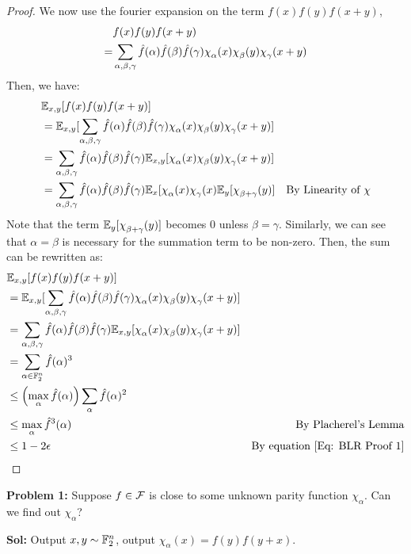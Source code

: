 \begin{theorem}
\begin{proof}
        We now use the fourier expansion on the term $f(x)f(y)f(x+y)$,
        \begin{align*}
            &f(x)f(y)f(x+y)\\
            =&\sum_{\alpha,\beta,\gamma} \fhat(\alpha)\fhat(\beta)\fhat(\gamma) \chi_\alpha(x)\chi_\beta(y)\chi_\gamma(x+y)
        \end{align*}
        Then, we have:
        \begin{align*}
            &\E_{x,y} [f(x)f(y)f(x+y)]\\
            &=\E_{x,y} [\sum_{\alpha,\beta,\gamma} \fhat(\alpha)\fhat(\beta)\fhat(\gamma) \chi_\alpha(x)\chi_\beta(y)\chi_\gamma(x+y)]\\
            &= \sum_{\alpha,\beta,\gamma} \fhat(\alpha)\fhat(\beta)\fhat(\gamma) \E_{x,y} [\chi_\alpha(x)\chi_\beta(y)\chi_\gamma(x+y)]\\
            &= \sum_{\alpha,\beta,\gamma} \fhat(\alpha)\fhat(\beta)\fhat(\gamma) \E_{x} [\chi_\alpha(x) \chi_\gamma(x)\E_y [\chi_{\beta+\gamma}(y)] &\text{By Linearity of $\chi$}\\
        \end{align*}
        Note that the term $\E_y [\chi_{\beta+\gamma}(y)]$ becomes $0$ unless $\beta = \gamma$. Similarly, we can see that $\alpha = \beta$ is necessary for the summation term to be non-zero. Then, the sum can be rewritten as:
        \begin{align*}
            &\E_{x,y} [f(x)f(y)f(x+y)]\\
            &=\E_{x,y} [\sum_{\alpha,\beta,\gamma} \fhat(\alpha)\fhat(\beta)\fhat(\gamma) \chi_\alpha(x)\chi_\beta(y)\chi_\gamma(x+y)]\\
            &= \sum_{\alpha,\beta,\gamma} \fhat(\alpha)\fhat(\beta)\fhat(\gamma) \E_{x,y} [\chi_\alpha(x)\chi_\beta(y)\chi_\gamma(x+y)]\\
            &= \sum_{\alpha \in \F_2^n} \fhat(\alpha)^3\\
            &\leq \left(\max_\alpha \fhat(\alpha) \right)\sum_{\alpha} \fhat(\alpha)^2\\
            &\leq \max_\alpha \fhat^3(\alpha) &\text{By Placherel's Lemma}\\
            &\leq 1 - 2\epsilon &\text{By equation \ref{Eq: BLR Proof 1}}
        \end{align*}

        
    \end{proof}
\end{theorem}

\textbf{Problem 1: } Suppose $f \in \mathcal{F}$ is close to some unknown parity function $\chi_\alpha$. Can we find out $\chi_\alpha$?

\textbf{Sol: } Output $x,y \sim \mathbb{F}_2^n$, output $\chi_\alpha(x) = f(y)f(y+x)$.

